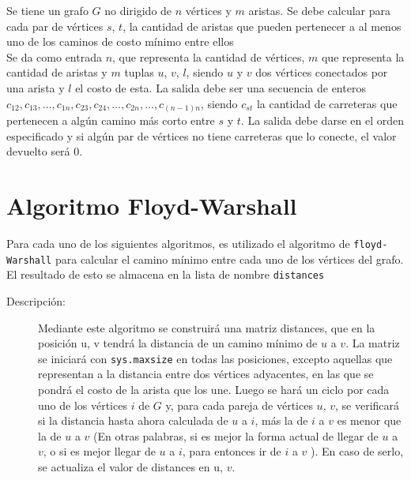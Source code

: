 \documentclass[a4paper,12pt,twocolumn]{article}
\begin{document}
	Se tiene un grafo $G$ no dirigido de $n$ vértices y $m$ aristas. Se debe calcular para cada par de vértices $s$, $t$, la cantidad de aristas que pueden pertenecer a al menos uno de los caminos de costo mínimo entre ellos\\  
	
	Se da como entrada $n$, que representa la cantidad de vértices, $m$ que representa la cantidad de aristas y $m$ tuplas $u$, $v$, $l$, siendo $u$ y $v$ dos vértices conectados por una arista y $l$ el costo de esta. La salida debe ser una secuencia de enteros $c_{12}, c_{13}, … , c_{1n}, c_{23}, c_{24}, … , c_{2n}, … , c_{(n-1)n}$, siendo $c_{st}$ la cantidad de carreteras que pertenecen a algún camino más corto entre $s$ y $t$. La salida debe darse en el orden especificado y si algún par de vértices no tiene carreteras que lo conecte, el valor devuelto será 0.\\
  
   




 
	\section{Algoritmo Floyd-Warshall}
		Para cada uno de los siguientes algoritmos, es utilizado el algoritmo de \texttt{\ttfamily floyd-Warshall} para calcular el camino mínimo entre cada uno de los vértices del grafo. El resultado de esto se almacena en la lista de nombre \texttt{\ttfamily distances}
	
	\begin{description}
		\item[Descripción:] Mediante este algoritmo se construirá una matriz distances, que en la posición u, v  tendrá la distancia de un camino mínimo de $u$ a $v$. La matriz se iniciará con \texttt{\ttfamily sys.maxsize} en todas las posiciones, excepto aquellas que representan a la distancia entre dos vértices adyacentes, en las que se pondrá el costo de la arista que los une. Luego se hará un ciclo por cada uno de los vértices $i$ de $G$ y, para cada pareja de vértices $u$, $v$, se verificará si la distancia hasta ahora calculada de $u$ a $i$, más la de $i$ a $v$ es menor que la de $u$ a $v$ (En otras palabras, si es mejor la forma actual de llegar de $u$ a $v$, o si es mejor llegar de $u$ a $i$, para entonces ir de $i$ a $v$ ). En caso de serlo, se actualiza el valor de distances en u, $v$.\\
		
	\end{description}
	
\end{document}
